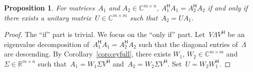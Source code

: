 \documentclass[11pt,a4paper]{article}  %
\newcommand{\bibfile}{svd.bib}  %
\numberwithin{equation}{section}
\newtheorem{proposition}{Proposition}%
\theoremstyle{definition}
\def\RR{\mathbb{R}}
\def\CC{\mathbb{C}}
\newcommand{\hmt}{{\scriptscriptstyle{{\mathsf{H}}}}}
\begin{document}
\begin{proposition}
  For matrices~$A_1$ and $A_2 \in \CC^{m\times n}$, $A_1^\hmt A_1 = A_2^\hmt A_2$ if and only if there exists a unitary
  matrix~$U \in \CC^{m\times m}$ such that~$A_2 = UA_1$.
\end{proposition}

\begin{proof}
  The ``if'' part is trivial. We focus on the ``only if'' part.
  Let~$V \Lambda V^\hmt$ be an eigenvalue decomposition of~$A_1^\hmt A_1 = A_2^\hmt A_2$ such that
  the diagonal entries of~$\Lambda$ are descending. By
  Corollary~\ref{coro:eyfull}, there exists $W_1$, $W_2\in \CC^{m\times m}$ and~$\Sigma \in \RR^{m\times n}$
  such that~$A_1=W_1 \Sigma V^\hmt$
  and~$A_2 = W_2 \Sigma V^\hmt$. Set~$U = W_2W_1^\hmt$.
\end{proof}

\small


\end{document}
